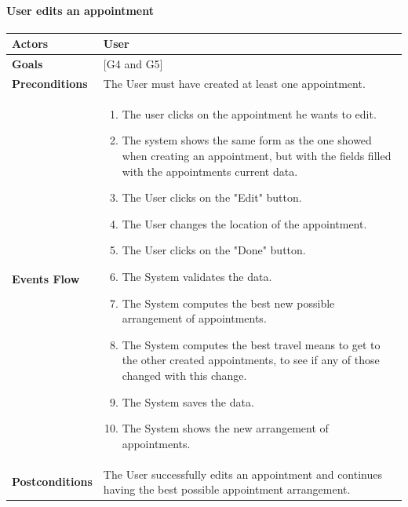 \documentclass[12pt]{article}
\begin{document}
\newpage

\paragraph{User edits an appointment}

\begin{center}
    \begin{tabular} { |p{}|p{}| }
        \hline
        \textbf{Actors} & User \\ 
        \hline
        \textbf{Goals} & {[G4 and G5]} \\ 
        \hline  
        \textbf{Preconditions} & The User must have created at least one appointment. \\ 
        \hline
        \textbf{Events Flow} & \begin{enumerate}[topsep=0pt] 
                            \setlength{\itemsep}{0.5pt}
                            \item The user clicks on the appointment he wants to edit.
                            \item The system shows the same form as the one showed when creating an appointment, but with the fields filled with the appointments current data.
                            \item The User clicks on the "Edit" button.
                            \item The User changes the location of the appointment.
                            \item The User clicks on the "Done" button.
                            \item The System validates the data.
                            \item The System computes the best new possible arrangement of appointments.
                            \item The System computes the best travel means to get to the other created appointments, to see if any of those changed with this change.
                            \item The System saves the data.
                            \item The System shows the new arrangement of appointments.
                            \end{enumerate} \\
        \hline
        \textbf{Postconditions} & The User successfully edits an appointment and continues having the best possible appointment arrangement. \\

\end{tabular}
\end{center}
\end{document}
